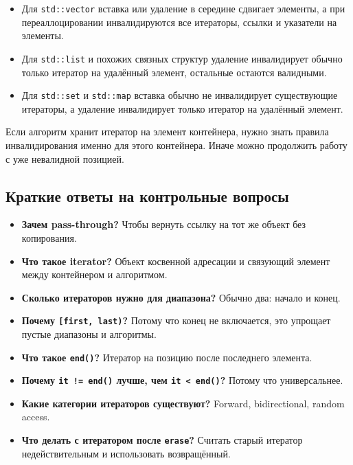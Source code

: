 \begin{itemize}
    \item Для \texttt{std::vector} вставка или удаление в середине сдвигает элементы, а при переаллоцировании инвалидируются все итераторы, ссылки и указатели на элементы.
    \item Для \texttt{std::list} и похожих связных структур удаление инвалидирует обычно только итератор на удалённый элемент, остальные остаются валидными.
    \item Для \texttt{std::set} и \texttt{std::map} вставка обычно не инвалидирует существующие итераторы, а удаление инвалидирует только итератор на удалённый элемент.
\end{itemize}

\begin{remark}
Если алгоритм хранит итератор на элемент контейнера, нужно знать правила инвалидирования именно для этого контейнера. Иначе можно продолжить работу с уже невалидной позицией.
\end{remark}

\subsection{Краткие ответы на контрольные вопросы}
\begin{itemize}
    \item \textbf{Зачем pass-through?} Чтобы вернуть ссылку на тот же объект без копирования.
    \item \textbf{Что такое iterator?} Объект косвенной адресации и связующий элемент между контейнером и алгоритмом.
    \item \textbf{Сколько итераторов нужно для диапазона?} Обычно два: начало и конец.
    \item \textbf{Почему \texttt{[first, last)}?} Потому что конец не включается, это упрощает пустые диапазоны и алгоритмы.
    \item \textbf{Что такое \texttt{end()}?} Итератор на позицию после последнего элемента.
    \item \textbf{Почему \texttt{it != end()} лучше, чем \texttt{it < end()}?} Потому что универсальнее.
    \item \textbf{Какие категории итераторов существуют?} Forward, bidirectional, random access.
    \item \textbf{Что делать с итератором после \texttt{erase}?} Считать старый итератор недействительным и использовать возвращённый.
\end{itemize}
